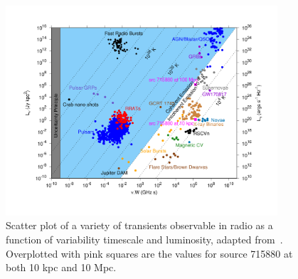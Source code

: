 \documentclass[12pt]{article}
\begin{document}
\begin{figure}
	\includegraphics[width=0.9\textwidth]{phase_space_ewass.pdf}
	\caption{Scatter plot of a variety of transients observable in radio as a function of variability timescale and luminosity, adapted from~\citet{2015MNRAS.446.3687P}. Overplotted with pink squares are the values for source 715880 at both 10 kpc and 10 Mpc.}
	\label{fig:transphasespace}
\end{figure}
\end{document}
